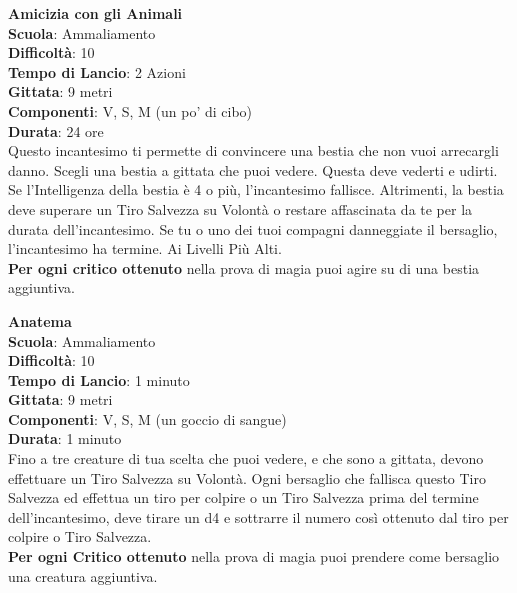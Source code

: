 \begin{multicols}{2}
\medskip\textbf{Amicizia con gli Animali}\\
\textbf{Scuola}: Ammaliamento\\
\textbf{Difficoltà}:  10\\
\textbf{Tempo di Lancio}: 2 Azioni\\
\textbf{Gittata}: 9 metri\\
\textbf{Componenti}: V, S, M (un po’ di cibo)\\
\textbf{Durata}: 24 ore\\
Questo incantesimo ti permette di convincere una bestia che non vuoi arrecargli danno. Scegli una bestia a gittata che puoi vedere. Questa deve vederti e udirti. Se l’Intelligenza della bestia è 4 o più, l'incantesimo fallisce. Altrimenti, la bestia deve superare un Tiro Salvezza su Volontà o restare affascinata da te per la durata dell'incantesimo. Se tu o uno dei tuoi compagni danneggiate il bersaglio, l'incantesimo ha termine. Ai Livelli Più Alti.\\
\textbf{Per ogni critico ottenuto} nella prova di magia puoi agire su di una bestia aggiuntiva. 

\medskip\textbf{Anatema}\\
\textbf{Scuola}: Ammaliamento\\
\textbf{Difficoltà}:  10\\
\textbf{Tempo di Lancio}: 1 minuto\\
\textbf{Gittata}: 9 metri\\
\textbf{Componenti}: V, S, M (un goccio di sangue)\\
\textbf{Durata}: 1 minuto\\
Fino a tre creature di tua scelta che puoi vedere, e che sono a gittata, devono effettuare un Tiro Salvezza su Volontà. Ogni bersaglio che fallisca questo Tiro Salvezza ed effettua un tiro per colpire o un Tiro Salvezza prima del termine dell'incantesimo, deve tirare un d4 e sottrarre il numero così ottenuto dal tiro per colpire o Tiro Salvezza.\\
\textbf{Per ogni Critico ottenuto} nella prova di magia puoi prendere come bersaglio una creatura aggiuntiva.


\end{multicols}
